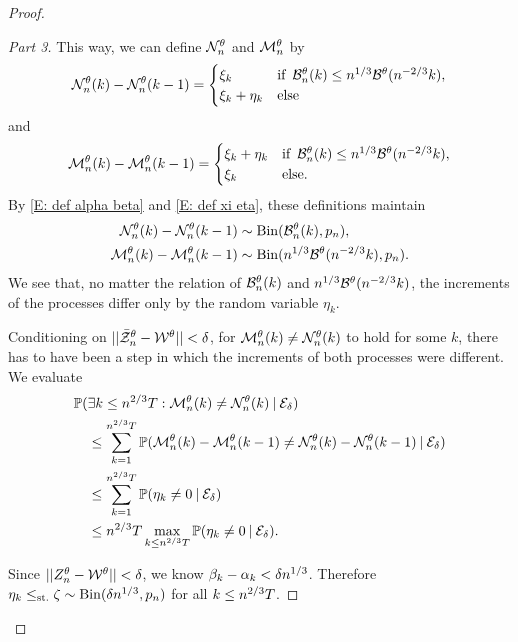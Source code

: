 \begin{proof}
\begin{proof}[Part 3]
This way, we can define $\mathcal{N}_n^{\theta}$ and $\mathcal{M}_n^{\theta}$ by
\begin{equation}
\mathcal{N}_n^{\theta}(k) - \mathcal{N}_n^{\theta}(k-1) = 
\begin{cases}
\xi_k & \text{if} \enspace \mathcal{B}_n^{\theta}(k) \leq n^{1 / 3}\mathcal{B}^{\theta}(n^{-2 / 3}k), \\
\xi_k + \eta_k &\text{else}
\end{cases}
\end{equation}
and
\begin{equation}
\mathcal{M}_n^{\theta}(k) - \mathcal{M}_n^{\theta}(k-1) = 
\begin{cases}
\xi_k + \eta_k & \text{if} \enspace \mathcal{B}_n^{\theta}(k) \leq n^{1 / 3}\mathcal{B}^{\theta}(n^{-2 / 3}k), \\
\xi_k &\text{else}.
\end{cases}
\end{equation}
By \eqref{E: def alpha beta} and \eqref{E: def xi eta},
these definitions maintain
\begin{equation*}
\begin{aligned}
\mathcal{N}_n^{\theta}(k) - \mathcal{N}_n^{\theta}(k-1) &\sim \operatorname*{Bin}(\mathcal{B}_n^{\theta}(k), p_n), \\
\mathcal{M}_n^{\theta}(k) - \mathcal{M}_n^{\theta}(k-1) &\sim \operatorname*{Bin}(n^{1 / 3} \mathcal{B}^{\theta}(n^{-2 / 3}k), p_n).
\end{aligned}
\end{equation*}
We see that, no matter the relation of $\mathcal{B}_n^{\theta}(k)$ and $n^{1 / 3}\mathcal{B}^{\theta}(n^{-2 / 3}k)$, 
the increments of the processes differ only by the random variable $\eta_k$.

Conditioning on $||\bar{\mathcal{Z}}^{\theta}_n - \mathcal{W}^{\theta}|| < \delta$, for $\mathcal{M}_n^{\theta}(k) \neq \mathcal{N}_n^{\theta}(k)$ to hold for some $k$,
there has to have been a step in which the increments of both processes were different.
We evaluate
\begin{equation} \label{E: Prob eta not 0}
\begin{aligned}
&\mathbb{P}(\exists k\leq n^{2 / 3}T: \mathcal{M}_n^{\theta}(k) \neq \mathcal{N}_n^{\theta}(k) \: | \: \mathcal{E}_{\delta}) \\
&\quad \leq \sum_{k=1}^{n^{2 / 3}T} \mathbb{P}( \mathcal{M}_n^{\theta}(k) - \mathcal{M}_n^{\theta}(k-1) \neq \mathcal{N}_n^{\theta}(k) - \mathcal{N}_n^{\theta}(k-1) \: | \: \mathcal{E}_{\delta}) \\
&\quad \leq \sum_{k=1}^{n^{2 / 3}T} \mathbb{P}( \eta_k \neq 0 \: | \: \mathcal{E}_{\delta}) \\
&\quad \leq n^{2 / 3}T \max_{k \leq n^{2 / 3}T} \mathbb{P}(\eta_k \neq 0 \: | \: \mathcal{E}_{\delta}).
\end{aligned}
\end{equation}

Since $||Z_n^{\theta} - \mathcal{W}^{\theta}|| < \delta$, we know $\beta_k - \alpha_k < \delta n^{1 / 3}$. Therefore
$\eta_k \leq_{\text{st.}} \zeta \sim \operatorname*{Bin}(\delta n^{1 / 3}, p_n)$ for all $k \leq n^{2 / 3}T$.


\end{proof}
\end{proof}
